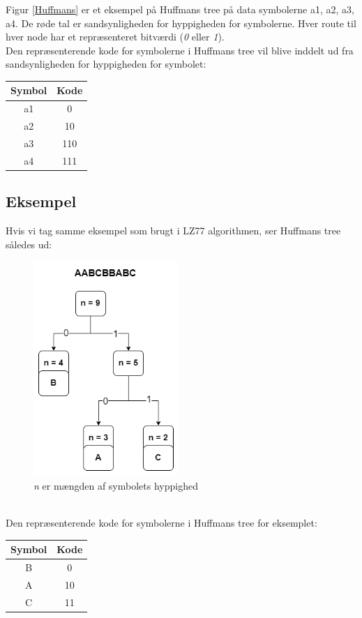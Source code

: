 \documentclass[12pt]{article}
\begin{document}
Figur \ref{Huffmans} er et eksempel på Huffmans tree på data symbolerne {a1, a2, a3, a4}. De røde tal er sandsynligheden for hyppigheden for symbolerne.
Hver route til hver node har et repræsenteret bitværdi (\textit{0} eller \textit{1}). \\
Den repræsenterende kode for symbolerne i Huffmans tree vil blive inddelt ud fra sandsynligheden for hyppigheden for symbolet:
\begin{table}[ht]
  \centering
  \begin{tabular}{ |c|c| }
   \hline
   \textbf{Symbol} & \textbf{Kode} \\
   \hline
   a1 &  0  \\
   \hline
   a2 & 10  \\
   \hline
   a3 &  110 \\
   \hline
   a4 &  111 \\
   \hline
  \end{tabular}
\end{table}
\newpage
\subsection{Eksempel}
Hvis vi tag samme eksempel som brugt i LZ77 algorithmen, ser Huffmans tree således ud:
\begin{figure}[ht]%
  \centering
  \includegraphics[width=5.5cm]{Huffman_abc_example.png}%
  \caption{\centering \textit{n} er mængden af symbolets hyppighed}%
\end{figure}\\
Den repræsenterende kode for symbolerne i Huffmans tree for eksemplet:
\begin{table}[ht]
  \centering
  \begin{tabular}{ |c|c| }
   \hline
   \textbf{Symbol} & \textbf{Kode} \\
   \hline
   B &  0  \\
   \hline
   A & 10  \\
   \hline
   C &  11 \\
   \hline
  \end{tabular}
\end{table}
\end{document}
